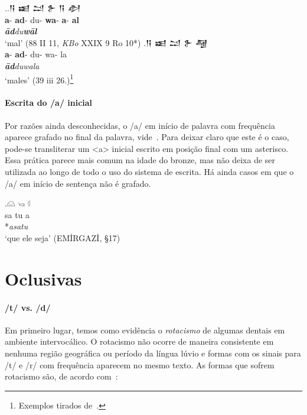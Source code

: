\ex.\ag.\foreignlanguage{hittite}{𒀀} \foreignlanguage{hittite}{𒀜}
\foreignlanguage{hittite}{𒁺}  \foreignlanguage{hittite}{𒉿}
\foreignlanguage{hittite}{𒀀}  \foreignlanguage{hittite}{𒀠}\\
\textbf{a}- \textbf{ad}- du- \textbf{wa}- \textbf{a}- \textbf{al}\\
\emph{\textbf{ād}du\textbf{wāl}}\\
`mal' (88 II 11, \emph{KBo} XXIX 9 Ro 10*)
\bg.\foreignlanguage{hittite}{𒀀} \foreignlanguage{hittite}{𒀜}
\foreignlanguage{hittite}{𒁺}  \foreignlanguage{hittite}{𒉿}
\foreignlanguage{hittite}{𒆷}\\
\textbf{a}- \textbf{ad}- du- wa- la\\
\emph{\textbf{ād}duwala}\\
`males' (39 iii 26.)\footnote{Exemplos tirados de~\citet{Melchert1993}.}

\paragraph{Escrita do /a/ inicial} Por razões ainda desconhecidas, o /a/ em
início de palavra com frequência aparece grafado no final da palavra,
vide~\Next. Para deixar claro que este é o caso, pode-se transliterar um <a>
inicial escrito em posição final com um asterisco.
Essa prática parece mais comum na idade do bronze, mas não deixa de ser
utilizada ao longo de todo o uso do sistema de escrita.
Há ainda casos em que o /a/ em início de sentença não é grafado.

\exg.\Large 𔗔 \Large  𔑢 \Large 𔗷\\
sa tu a\\
*\emph{asatu}\\
`que ele seja' (EMİRGAZİ, §17)



\section{Oclusivas}

\paragraph{/t/ vs. /d/}
Em primeiro lugar, temos como evidência o \emph{rotacismo} de algumas dentais em
ambiente intervocálico.
O rotacismo não ocorre de maneira consistente em nenhuma região geográfica ou
período da língua lúvio e formas com os sinais para /t/ e /r/ com frequência
aparecem no mesmo texto.
As formas que sofrem rotacismo são, de acordo
com~\citet[249--50]{MorpurgoDavies1982}:

